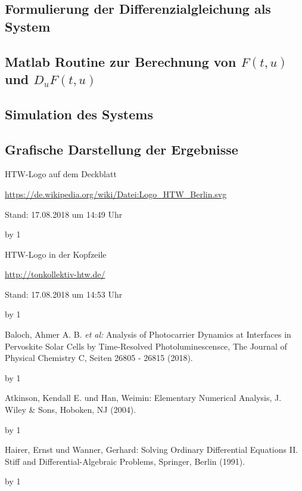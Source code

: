 \documentclass[
	pagesize,
	fontsize=12pt,
	paper=a4,
	oneside,
   reqno
]{scrartcl}
\begin{document}
\subsection{Formulierung der Differenzialgleichung als System}

\subsection{Matlab Routine zur Berechnung von $F(t,u)$ und $D_uF(t,u)$}

\subsection{Simulation des Systems}

\subsection{Grafische Darstellung der Ergebnisse}

\clearpage

\newpage
\newcount\Quellennummer
{}

\renewcommand\refname{Literaturverzeichnis}

\begin{thebibliography}{999}
{\setlength{\emergencystretch}{3cm}%

HTW-Logo auf dem Deckblatt\par
\url{https://de.wikipedia.org/wiki/Datei:Logo_HTW_Berlin.svg} \par
 Stand: 17.08.2018 um 14:49 Uhr

\advance\Quellennummer by 1
 
HTW-Logo in der Kopfzeile\par
\url{http://tonkollektiv-htw.de/} \par
 Stand: 17.08.2018 um 14:53 Uhr

\advance\Quellennummer by 1

Baloch, Ahmer A. B. \textit{et al:} \glqq Analysis of Photocarrier Dynamics at Interfaces in Pervoskite Solar Cells by Time-Resolved Photoluminescensce\grqq{}, The Journal of Physical Chemistry C, Seiten 26805 - 26815 (2018).

\advance\Quellennummer by 1

Atkinson, Kendall E. und Han, Weimin: \glqq Elementary Numerical Analysis\grqq{}, J. Wiley \& Sons, Hoboken, NJ (2004).

\advance\Quellennummer by 1

Hairer, Ernst und Wanner, Gerhard: \glqq Solving Ordinary Differential Equations II. Stiff and Differential-Algebraic Problems\grqq{}, Springer, Berlin (1991).

\advance\Quellennummer by 1

}
\end{thebibliography}
\end{document}
